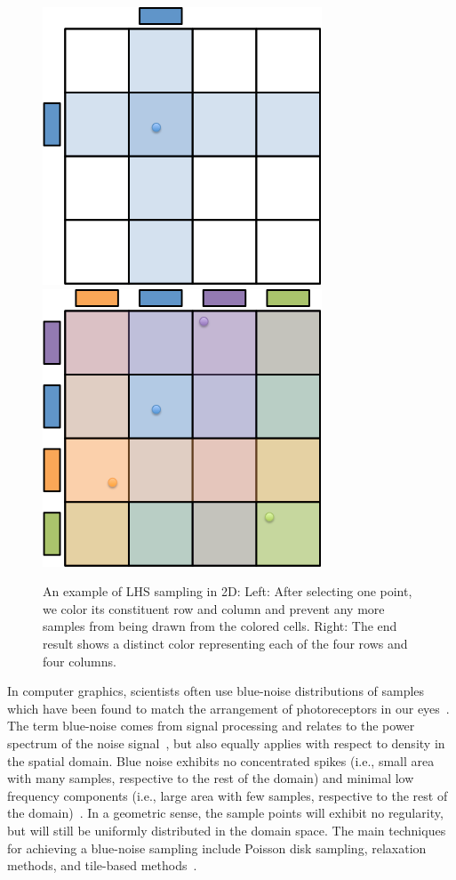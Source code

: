 \begin{figure}[t]
  \centering
  \includegraphics[width=.45\textwidth]{figs/chap3/lhs}\qquad
  \includegraphics[width=.45\textwidth]{figs/chap3/lhs2}
  \caption[2D Latin Hypercube Sampling Example]{An example of LHS sampling in
  2D: Left: After selecting one point, we color its constituent row and column
  and prevent any more samples from being drawn from the colored cells.
  Right: The end result shows a distinct color representing each of the four
  rows and four columns.}
  \label{fig:lhsExample}
\end{figure}

In computer graphics, scientists often use blue-noise distributions of samples which have been found to match the arrangement of photoreceptors in our eyes~\cite{Yellott1982}.
%
The term blue-noise comes from signal processing and relates to the power spectrum of the noise signal~\cite{Tuzlukov2002}, but also equally applies with respect to density in the spatial domain.
%
Blue noise exhibits no concentrated spikes (i.e., small area with many samples, respective to the rest of the domain) and minimal low frequency components (i.e., large area with few samples, respective to the rest of the domain)~\cite{YanGuoWang2015}.
%
In a geometric sense, the sample points will exhibit no regularity, but will still be uniformly distributed in the domain space.
%
The main techniques for achieving a blue-noise sampling include Poisson disk sampling, relaxation methods, and tile-based methods~\cite{YanGuoWang2015}.

